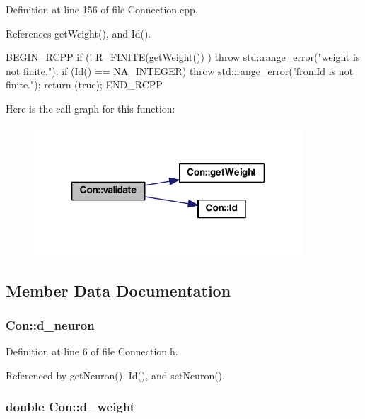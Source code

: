 Definition at line 156 of file Connection.cpp.



References getWeight(), and Id().


\begin{DoxyCode}
{
  BEGIN_RCPP
  if (! R_FINITE(getWeight()) ) throw std::range_error("weight is not finite.");
  if (Id() == NA_INTEGER)
    throw std::range_error("fromId is not finite.");
  return (true);
END_RCPP}
\end{DoxyCode}


Here is the call graph for this function:\nopagebreak
\begin{figure}[H]
\begin{center}
\leavevmode
\includegraphics[width=284pt]{class_con_af5f836a7b0988b3d9113589b2959d5e6_cgraph}
\end{center}
\end{figure}




\subsection{Member Data Documentation}
\hypertarget{class_con_aad857bd289343ecff2153acc852f34f0}{
\subsubsection[{d\_\-neuron}]{ {\bf Con::d\_\-neuron}}}
\label{class_con_aad857bd289343ecff2153acc852f34f0}


Definition at line 6 of file Connection.h.



Referenced by getNeuron(), Id(), and setNeuron().

\hypertarget{class_con_a41e043e0dfb126f3bdacbbd8caf33672}{
\subsubsection[{d\_\-weight}]{\setlength{\rightskip}{0pt plus 5cm}double {\bf Con::d\_\-weight}}}
\label{class_con_a41e043e0dfb126f3bdacbbd8caf33672}


